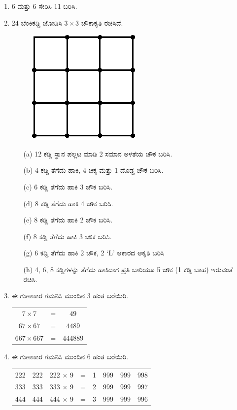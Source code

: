 \begin{enumerate}
\item 6 ಮತ್ತು 6 ಸೇರಿಸಿ 11 ಬರಿಸಿ. 

\item 24 ಬೆಂಕಿಕಡ್ಡಿ ಜೋಡಿಸಿ $3\times 3$ ಚೌಕಾಕೃತಿ ರಚಿಸಿದೆ. 
\begin{figure}[H]
\centering
\includegraphics{images/chap8/q13.eps}
\end{figure}
\begin{itemize}
\item[(a)] 12 ಕಡ್ಡಿ ಸ್ಥಾನ ಪಲ್ಲಟ ಮಾಡಿ 2 ಸಮಾನ ಅಳತೆಯ ಚೌಕ ಬರಿಸಿ.
\item[(b)] 4 ಕಡ್ಡಿ ತೆಗೆದು ಹಾಕಿ, 4 ಚಿಕ್ಕ ಮತ್ತು 1 ದೊಡ್ಡ ಚೌಕ ಬರಿಸಿ.
\item[(c)] 6 ಕಡ್ಡಿ ತೆಗೆದು ಹಾಕಿ 3 ಚೌಕ ಬರಿಸಿ.
\item[(d)] 8 ಕಡ್ಡಿ ತೆಗೆದು ಹಾಕಿ 4 ಚೌಕ ಬರಿಸಿ.
\item[(e)] 8 ಕಡ್ಡಿ ತೆಗೆದು ಹಾಕಿ 2 ಚೌಕ ಬರಿಸಿ.
\item[(f)] 8 ಕಡ್ಡಿ ತೆಗೆದು ಹಾಕಿ 3 ಚೌಕ ಬರಿಸಿ.
\item[(g)] 6 ಕಡ್ಡಿ ತೆಗೆದು ಹಾಕಿ 2 ಚೌಕ, 2 `L' ಆಕಾರದ ಆಕೃತಿ ಬರಿಸಿ 
\item[(h)] 4, 6, 8 ಕಡ್ಡಿಗಳನ್ನು ತೆಗೆದು ಹಾಕಿದಾಗ ಪ್ರತಿ ಬಾರಿಯೂ 5 ಚೌಕ (1 ಕಡ್ಡಿ ಬಾಹ) ಇರುವಂತೆ ರಚಿಸಿ. 
\end{itemize}

\item ಈ ಗುಣಾಕಾರ ಗಮನಿಸಿ ಮುಂದಿನ 3 ಹಂತ ಬರೆಯಿರಿ.

\begin{tabular}[t]{ccc}
$7\times 7$ & = & $49$\\
$67\times 67$ & = & $4489$\\
$667\times 667$ & = & $444889$
\end{tabular}

\item ಈ ಗುಣಾಕಾರ ಗಮನಿಸಿ ಮುಂದಿನ 6 ಹಂತ ಬರೆಯಿರಿ. 

\begin{tabular}[t]{cccccccc}
222 & 222 & 222 $\times$ 9 & = & 1 & 999 & 999 & 998\\
333 & 333 & 333 $\times$ 9 & = & 2 & 999 & 999 & 997\\
444 & 444 & 444 $\times$ 9 & = & 3 & 999 & 999 & 996
\end{tabular}


\end{enumerate}
